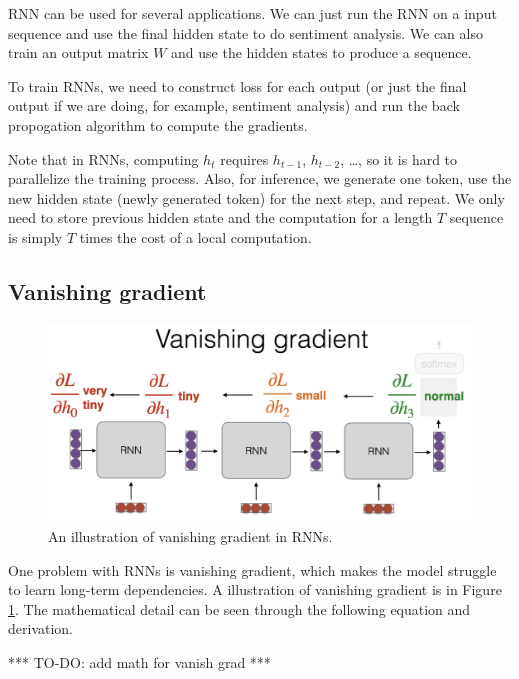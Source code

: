 \documentclass[a4paper]{article}
\begin{document}
RNN can be used for several applications. We can just 
run the RNN on a input sequence and use the final hidden 
state to do sentiment analysis. We can also train 
an output matrix $W$ and use the hidden states to 
produce a sequence.

To train RNNs, we need to construct loss for each 
output (or just the final output if we are doing, 
for example, sentiment analysis) and run the back propogation
algorithm to compute the gradients.

Note that in RNNs, computing $h_t$ requires $h_{t-1}$, 
$h_{t-2}$, \dots, so it is hard to parallelize the training
process. Also, for inference, we generate one token, 
use the new hidden state (newly generated token) for the 
next step, and repeat. We only need to store previous 
hidden state and the computation for a length $T$ sequence
is simply $T$ times the cost of a local computation.

\subsection{Vanishing gradient}

\begin{figure}[h!]
  \centering 
  \includegraphics[width=0.5\linewidth]{figs/vanish-grad.png}
  \caption{An illustration of vanishing gradient in RNNs.}
  \label{vanish-grad}
\end{figure}

One problem with RNNs is vanishing gradient, which 
makes the model struggle to learn long-term dependencies.
A illustration of vanishing gradient is in Figure \ref{vanish-grad}.
The mathematical detail can be seen through the following 
equation and derivation. 

*** TO-DO: add math for vanish grad *** 
\end{document}
